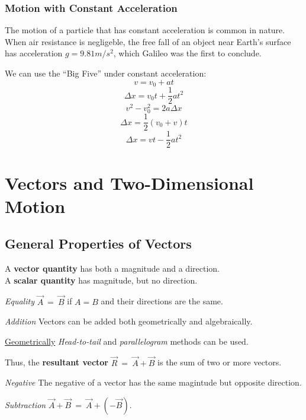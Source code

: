 \documentclass[11pt,letter]{report}
\begin{document}
\subsection*{Motion with Constant Acceleration}

The motion of a particle that has constant acceleration is common in nature. When air resistance is negligeble, the free fall of an object near Earth's surface has acceleration $g=9.81 m/s^{2}$, which Galileo was the first to conclude.

\noindent
We can use the ``Big Five'' under constant acceleration:
$$v=v_{0}+at$$
$$\Delta{x}=v_{0}t+\frac{1}{2}at^{2}$$
$$v^{2}-v^{2}_{0}=2a\Delta{x}$$
$$\Delta{x}=\frac{1}{2}\left(v_{0}+v\right)t$$
$$\Delta{x}=vt-\frac{1}{2}at^{2}$$

\chapter*{Vectors and Two-Dimensional Motion}

\section*{General Properties of Vectors}

A \textbf{vector quantity} has both a magnitude and a direction.\\A \textbf{scalar quantity} has magnitude, but no direction.

\hspace{1mm}

\noindent
\textit{Equality} $\vec{A}\ =\ \vec{B}$ if $A = B$ and their directions are the same.

\hspace{1mm}

\noindent
\textit{Addition} Vectors can be added both geometrically and algebraically.

\underline{Geometrically} \textsl{Head-to-tail} and \textsl{parallelogram} methods can be used.

Thus, the \textbf{resultant vector} $\vec{R}\ =\ \vec{A} + \vec{B}$ is the sum of two or more vectors.

\hspace{1mm}

\noindent
\textit{Negative} The negative of a vector has the same magintude but opposite direction.

\hspace{1mm}

\noindent
\textit{Subtraction} $\vec{A} + \vec{B}\ =\ \vec{A} + \left(-\vec{B}\right)$.
\end{document}
